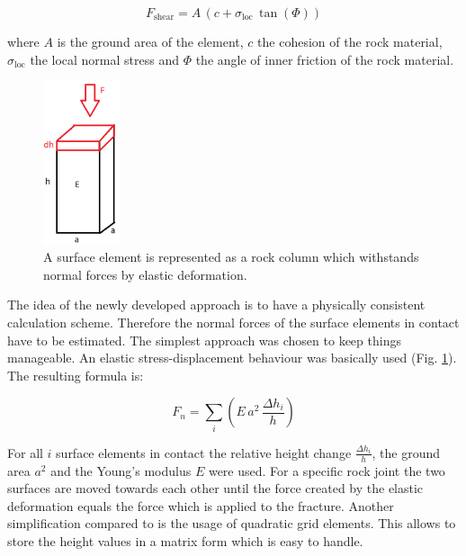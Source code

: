 \begin{equation}\label{eq:shear}
F_\text{shear}=A \, \left( c + \sigma_\text{loc} \, \tan(\Phi) \right)
\end{equation}

where $A$ is the ground area of the element, $c$ the cohesion of the rock material, $\sigma_\text{loc}$ the local normal stress and $\Phi$ the angle of inner friction of the rock material.

\begin{figure}[htb!]
\begin{center}
\includegraphics[width=0.2\textwidth]{./figures/FFS_NormalForce.png}
\end{center}
\caption{A surface element is represented as a rock column which with\-stands normal forces by elastic deformation.}
\label{Fig:FFS-NormalForce}
\end{figure}

The idea of the newly developed approach is to have a physically consistent calculation scheme. Therefore the normal forces of the surface elements in contact have to be estimated. The simplest approach was chosen to keep things manageable. An elastic stress-displacement behaviour was basically used (Fig. \ref{Fig:FFS-NormalForce}). The resulting formula is:

\begin{equation}
F_n= \sum_i \left( E \, a^2 \, \frac{\Delta h_i}{h} \right)
\end{equation}

For all $i$ surface elements in contact the relative height change $\frac{\Delta h_i}{h}$, the ground area $a^2$ and the Young's modulus $E$ were used. For a specific rock joint the two surfaces are moved towards each other until the force created by the elastic deformation equals the force which is applied to the fracture.
%
Another simplification compared to \cite{Casagrande2017} is the usage of quadratic grid elements. This allows to store the height values in a matrix form which is easy to handle.  